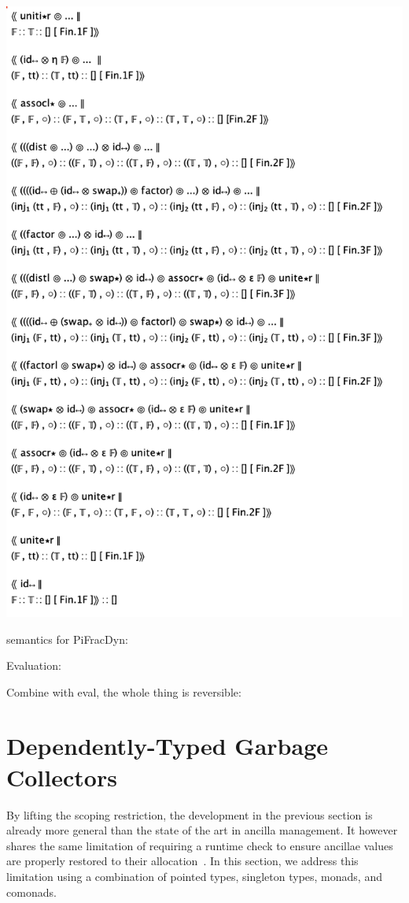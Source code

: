 \documentclass[sigplan,10pt,review,anonymous]{acmart}
\begin{document}
\includegraphics[scale=0.5]{trace2.png}

semantics for PiFracDyn:
\PIFMEMstate{}
\PIFMEMstep{}

Evaluation:
\PIPFeval{}

Combine with eval, the whole thing is reversible:
\PIPFrev{}

\section{Dependently-Typed Garbage Collectors}
\label{sec:dep}

By lifting the scoping restriction, the development in the previous
section is already more general than the state of the art in ancilla
management.  It however shares the same limitation of requiring a
runtime check to ensure ancillae values are properly restored to their
allocation~\cite{10.1007/978-3-319-20860-2_13,Green:2013:QSQ:2491956.2462177}.
In this section, we address this limitation using a combination of
pointed types, singleton types, monads, and comonads.
\end{document}
